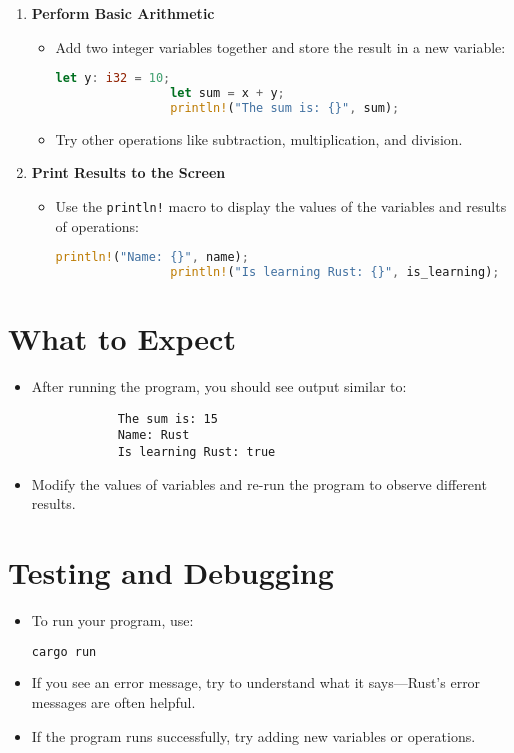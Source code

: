 \documentclass[12pt]{article}
\begin{document}
\begin{enumerate}
		\item \textbf{Perform Basic Arithmetic}
		\begin{itemize}
			\item Add two integer variables together and store the result in a new variable:
			\begin{lstlisting}[language=Rust]
				let y: i32 = 10;
				let sum = x + y;
				println!("The sum is: {}", sum);
			\end{lstlisting}
			\item Try other operations like subtraction, multiplication, and division.
		\end{itemize}
		
		\item \textbf{Print Results to the Screen}
		\begin{itemize}
			\item Use the \texttt{println!} macro to display the values of the variables and results of operations:
			\begin{lstlisting}[language=Rust]
				println!("Name: {}", name);
				println!("Is learning Rust: {}", is_learning);
			\end{lstlisting}
		\end{itemize}
	\end{enumerate}
	
	\section*{What to Expect}
	\begin{itemize}
		\item After running the program, you should see output similar to:
		\begin{verbatim}
			The sum is: 15
			Name: Rust
			Is learning Rust: true
		\end{verbatim}
		\item Modify the values of variables and re-run the program to observe different results.
	\end{itemize}
	
	\section*{Testing and Debugging}
	\begin{itemize}
		\item To run your program, use:
		\begin{lstlisting}[language=bash]
			cargo run
		\end{lstlisting}
		\item If you see an error message, try to understand what it says—Rust’s error messages are often helpful.
		\item If the program runs successfully, try adding new variables or operations.
	\end{itemize}
	
\end{document}
